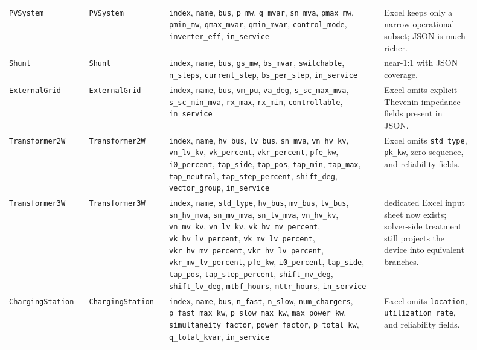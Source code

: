 \begin{longtable}{L{0.15\linewidth}L{0.15\linewidth}L{0.42\linewidth}L{0.18\linewidth}}
\texttt{PVSystem} & \texttt{PVSystem} & \texttt{index}, \texttt{name}, \texttt{bus}, \texttt{p\_mw}, \texttt{q\_mvar}, \texttt{sn\_mva}, \texttt{pmax\_mw}, \texttt{pmin\_mw}, \texttt{qmax\_mvar}, \texttt{qmin\_mvar}, \texttt{control\_mode}, \texttt{inverter\_eff}, \texttt{in\_service} & Excel keeps only a narrow operational subset; JSON is much richer. \\
\texttt{Shunt} & \texttt{Shunt} & \texttt{index}, \texttt{name}, \texttt{bus}, \texttt{gs\_mw}, \texttt{bs\_mvar}, \texttt{switchable}, \texttt{n\_steps}, \texttt{current\_step}, \texttt{bs\_per\_step}, \texttt{in\_service} & near-1:1 with JSON coverage. \\
\texttt{ExternalGrid} & \texttt{ExternalGrid} & \texttt{index}, \texttt{name}, \texttt{bus}, \texttt{vm\_pu}, \texttt{va\_deg}, \texttt{s\_sc\_max\_mva}, \texttt{s\_sc\_min\_mva}, \texttt{rx\_max}, \texttt{rx\_min}, \texttt{controllable}, \texttt{in\_service} & Excel omits explicit Thevenin impedance fields present in JSON. \\
\texttt{Transformer2W} & \texttt{Transformer2W} & \texttt{index}, \texttt{name}, \texttt{hv\_bus}, \texttt{lv\_bus}, \texttt{sn\_mva}, \texttt{vn\_hv\_kv}, \texttt{vn\_lv\_kv}, \texttt{vk\_percent}, \texttt{vkr\_percent}, \texttt{pfe\_kw}, \texttt{i0\_percent}, \texttt{tap\_side}, \texttt{tap\_pos}, \texttt{tap\_min}, \texttt{tap\_max}, \texttt{tap\_neutral}, \texttt{tap\_step\_percent}, \texttt{shift\_deg}, \texttt{vector\_group}, \texttt{in\_service} & Excel omits \texttt{std\_type}, \texttt{pk\_kw}, zero-sequence, and reliability fields. \\
\texttt{Transformer3W} & \texttt{Transformer3W} & \texttt{index}, \texttt{name}, \texttt{std\_type}, \texttt{hv\_bus}, \texttt{mv\_bus}, \texttt{lv\_bus}, \texttt{sn\_hv\_mva}, \texttt{sn\_mv\_mva}, \texttt{sn\_lv\_mva}, \texttt{vn\_hv\_kv}, \texttt{vn\_mv\_kv}, \texttt{vn\_lv\_kv}, \texttt{vk\_hv\_mv\_percent}, \texttt{vk\_hv\_lv\_percent}, \texttt{vk\_mv\_lv\_percent}, \texttt{vkr\_hv\_mv\_percent}, \texttt{vkr\_hv\_lv\_percent}, \texttt{vkr\_mv\_lv\_percent}, \texttt{pfe\_kw}, \texttt{i0\_percent}, \texttt{tap\_side}, \texttt{tap\_pos}, \texttt{tap\_step\_percent}, \texttt{shift\_mv\_deg}, \texttt{shift\_lv\_deg}, \texttt{mtbf\_hours}, \texttt{mttr\_hours}, \texttt{in\_service} & dedicated Excel input sheet now exists; solver-side treatment still projects the device into equivalent branches. \\
\texttt{ChargingStation} & \texttt{ChargingStation} & \texttt{index}, \texttt{name}, \texttt{bus}, \texttt{n\_fast}, \texttt{n\_slow}, \texttt{num\_chargers}, \texttt{p\_fast\_max\_kw}, \texttt{p\_slow\_max\_kw}, \texttt{max\_power\_kw}, \texttt{simultaneity\_factor}, \texttt{power\_factor}, \texttt{p\_total\_kw}, \texttt{q\_total\_kvar}, \texttt{in\_service} & Excel omits \texttt{location}, \texttt{utilization\_rate}, and reliability fields. \\

\end{longtable}
